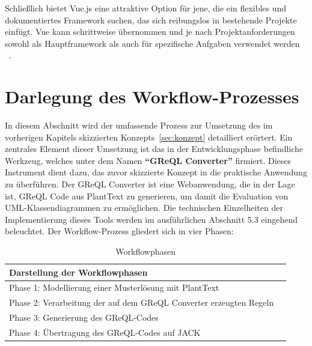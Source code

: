 Schließlich bietet Vue.js eine attraktive Option für jene, die ein flexibles und dokumentiertes Framework suchen,
das sich reibungslos in bestehende Projekte einfügt. Vue kann schrittweise übernommen und je nach Projektanforderungen
sowohl als Hauptframework als auch für spezifische Aufgaben verwendet werden ~\cite{wohlgethan2018supportingweb}.

\section{Darlegung des Workflow-Prozesses}\label{sec:darlegung-des-workflow-prozesses}

In diesem Abschnitt wird der umfassende Prozess zur Umsetzung des im vorherigen Kapitels skizzierten Konzepts~\ref{sec:konzept}
detailliert erörtert. Ein zentrales Element dieser Umsetzung ist das in der Entwicklungsphase befindliche
Werkzeug, welches unter dem Namen \textbf{``\gls{GReQL Converter}''} firmiert. Dieses Instrument dient dazu, das zuvor skizzierte
Konzept in die praktische Anwendung zu überführen. Der \gls{GReQL Converter} ist eine Webanwendung, die in der Lage ist,
GReQL Code aus PlantText zu generieren, um damit die Evaluation von UML-Klassendiagrammen zu ermöglichen. Die
technischen Einzelheiten der Implementierung dieses Tools werden im ausführlichen Abschnitt 5.3 eingehend beleuchtet.
Der Workflow-Prozess gliedert sich in vier Phasen:

\begin{table}[h!]
    \centering
    \caption{Workflowphasen}\label{tab:phasen}
    \begin{tabular}{ll}
        \toprule
        \textbf{Darstellung der Workflowphasen} \\
        \midrule
        Phase 1: Modellierung einer Musterlösung mit PlantText \\
        Phase 2: Verarbeitung der auf dem \gls{GReQL Converter} erzeugten Regeln \\
        Phase 3: Generierung des GReQL-Codes \\
        Phase 4: Übertragung des GReQL-Codes auf JACK \\
        \bottomrule
    \end{tabular}
\end{table}

